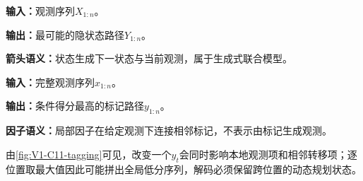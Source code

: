 \documentclass[UTF8,a4paper,11pt,openany]{ctexbook}
\begin{document}
\setcounter{page}{202}
\setcounter{chapter}{11}
\setcounter{figure}{0}
\pagestyle{headings}
\begin{center}
\begin{minipage}[t]{0.47\linewidth}
\begin{keypointbox}[title=HMM任务卡]
\textbf{输入：}观测序列$X_{1:n}$。\par
\textbf{输出：}最可能的隐状态路径$Y_{1:n}$。\par
\textbf{箭头语义：}状态生成下一状态与当前观测，属于生成式联合模型。
\end{keypointbox}
\end{minipage}\hfill
\begin{minipage}[t]{0.47\linewidth}
\begin{keypointbox}[title=CRF任务卡]
\textbf{输入：}完整观测序列$x_{1:n}$。\par
\textbf{输出：}条件得分最高的标记路径$y_{1:n}$。\par
\textbf{因子语义：}局部因子在给定观测下连接相邻标记，不表示由标记生成观测。
\end{keypointbox}
\end{minipage}
\end{center}

由\cref{fig:V1-C11-tagging}可见，改变一个$y_t$会同时影响本地观测项和相邻转移项；逐位置取最大值因此可能拼出全局低分序列，解码必须保留跨位置的动态规划状态。
\end{document}
